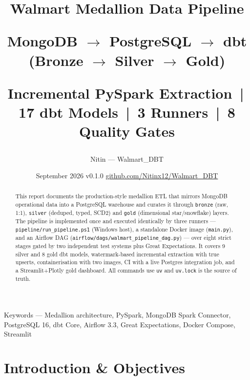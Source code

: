 \documentclass[11pt,a4paper]{article}
\title{
  \vspace{1.2cm}
  {\Huge\bfseries Walmart Medallion Data Pipeline\par}
  \vspace{0.35cm}
  {\Large MongoDB $\rightarrow$ PostgreSQL $\rightarrow$ dbt \quad (Bronze $\rightarrow$ Silver $\rightarrow$ Gold)\par}
  \vspace{0.45cm}
  {\large Incremental PySpark Extraction \,|\, 17 dbt Models \,|\, 3 Runners \,|\, 8 Quality Gates\par}
}
\author{
  Nitin \quad\textcolor{muted}{— Walmart\_DBT}
}
\date{
  September 2026 \quad\textcolor{muted}{\textbar\quad} v0.1.0 \quad\textcolor{muted}{\textbar\quad}
  \href{https://github.com/Nitinx12/Walmart_DBT}{github.com/Nitinx12/Walmart\_DBT}
}
\begin{document}
\maketitle
\thispagestyle{empty}
\begin{center}
\end{center}
\vspace{0.6cm}
\begin{abstract}
\noindent
This report documents the production-style medallion ETL that mirrors MongoDB operational data into a PostgreSQL warehouse and curates it through \texttt{bronze} (raw, 1:1), \texttt{silver} (deduped, typed, SCD2) and \texttt{gold} (dimensional star/snowflake) layers. The pipeline is implemented once and executed identically by three runners — \texttt{pipeline/run\_pipeline.ps1} (Windows host), a standalone Docker image (\texttt{main.py}), and an Airflow DAG (\texttt{airflow/dags/walmart\_pipeline\_dag.py}) — over eight strict stages gated by two independent test systems plus Great Expectations. It covers 9 silver and 8 gold dbt models, watermark-based incremental extraction with true upserts, containerisation with two images, CI with a live Postgres integration job, and a Streamlit+Plotly gold dashboard. All commands use \texttt{uv} and \texttt{uv.lock} is the source of truth.
\end{abstract}
\vspace{0.3cm}
\begin{center}
\small\textcolor{muted}{Keywords —} Medallion architecture, PySpark, MongoDB Spark Connector, PostgreSQL 16, dbt Core, Airflow 3.3, Great Expectations, Docker Compose, Streamlit
\end{center}
\newpage
\tableofcontents
\newpage

\section{Introduction \& Objectives}
\end{document}
